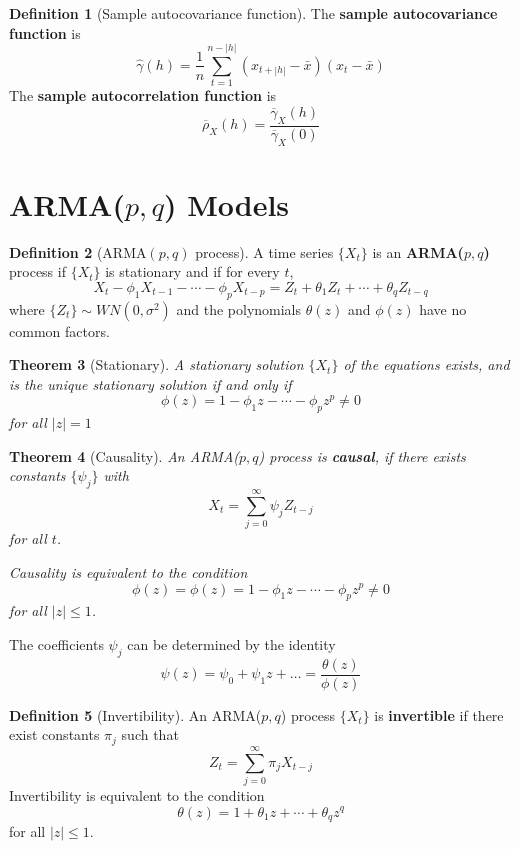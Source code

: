 \documentclass[10pt, oneside, reqno]{amsart}
\theoremstyle{plain}%
\newtheorem{thm}{Theorem}[section]
\theoremstyle{definition}
\newtheorem{defn}[thm]{Definition}
\theoremstyle{remark}
\newcommand{\ts}[1]{\{ #1 \}}
\newcommand{\ol}{\overline}
\begin{document}
\begin{defn}[Sample autocovariance function]
	The \textbf{sample autocovariance function} is \[
		\hat{\gamma}(h) = \frac{1}{n} \sum_{t=1}^{n-|h|} (x_{t+|h|} - \bar{x})(x_t - \bar{x})
	\]
	The \textbf{sample autocorrelation function} is \[
			\ol{\rho}_X(h) = \frac{\ol{\gamma}_X(h)}{\ol{\gamma}_X(0)}
	\]
\end{defn}


\section{ARMA($p,q$) Models} %
\label{sec:arma_model}

\begin{defn}[ARMA$(p,q)$ process]
	A time series $\ts{X_t}$ is an \textbf{ARMA($p,q$)} process if $\ts{X_t}$ is stationary and if for every $t$,\[
		X_t - \phi_1 X_{t-1} - \cdots - \phi_p X_{t-p} = Z_t + \theta_1 Z_t + \cdots + \theta_q Z_{t-q}
	\] where $\ts{Z_t} \sim WN(0,\sigma^2)$ and the polynomials $\theta(z)$ and $\phi(z)$ have no common factors.
\end{defn}

\begin{thm}[Stationary]
	A stationary solution $\ts{X_t}$ of the equations exists, and is the unique stationary solution if and only if \[
		\phi(z) = 1 - \phi_1 z - \cdots - \phi_p z^p \neq 0
	\] for all $|z| = 1$
\end{thm}

\begin{thm}[Causality]
	An ARMA($p,q$) process is \textbf{causal}, if there exists constants $\ts{\psi_j}$ with \[
		X_t = \sum_{j=0}^\infty \psi_j Z_{t-j}
	\] for all $t$.
	
	Causality is equivalent to the condition \[
		\phi(z) = \phi(z) = 1 - \phi_1 z - \cdots - \phi_p z^p \neq 0
	\] for all $|z| \leq 1$.
\end{thm}

The coefficients $\psi_j$ can be determined by the identity \[
	\psi(z) = \psi_0 + \psi_1 z + \dots = \frac{\theta(z)}{\phi(z)}
	\]


\begin{defn}[Invertibility]
	An ARMA($p,q$) process $\ts{X_t}$ is \textbf{invertible} if there exist constants $\pi_j$ such that \[
		Z_t = \sum_{j=0}^\infty \pi_j X_{t-j}
	\]
	Invertibility is equivalent to the condition \[
		\theta(z) = 1 + \theta_1 z + \cdots + \theta_q z^q
	\] for all $|z| \leq 1$.
\end{defn}
\end{document}
